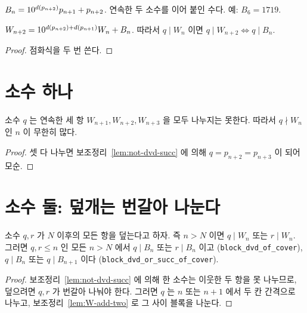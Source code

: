 \begin{definition}[블록]
  \label{def:B}
  \leanok
  \(B_n = 10^{d(p_{n+2})} p_{n+1} + p_{n+2}\). 연속한 두 소수를 이어 붙인 수다. 예: \(B_6 = 1719\).
\end{definition}

\begin{lemma}[두 칸 점화식, C4]
  \label{lem:W-add-two}
  \leanok
  \(W_{n+2} = 10^{d(p_{n+2}) + d(p_{n+1})} W_n + B_n\).
  따라서 \(q \mid W_n\) 이면 \(q \mid W_{n+2} \iff q \mid B_n\).
\end{lemma}
\begin{proof}
  \leanok
  점화식을 두 번 쓴다.
\end{proof}

\section{소수 하나}

\begin{theorem}[Q1, \(|S| = 1\), C5]
  \label{thm:one-prime}
  \leanok
  소수 \(q\) 는 연속한 세 항 \(W_{n+1}, W_{n+2}, W_{n+3}\) 을 모두 나누지는 못한다.
  따라서 \(q \nmid W_n\) 인 \(n\) 이 무한히 많다.
\end{theorem}
\begin{proof}
  \leanok
  셋 다 나누면 보조정리~\ref{lem:not-dvd-succ} 에 의해 \(q = p_{n+2} = p_{n+3}\) 이 되어 모순.
\end{proof}

\section{소수 둘: 덮개는 번갈아 나눈다}

\begin{lemma}[덮개와 블록]
  \label{lem:cover-block}
  \leanok
  소수 \(q, r\) 가 \(N\) 이후의 모든 항을 덮는다고 하자. 즉 \(n > N\) 이면 \(q \mid W_n\) 또는 \(r \mid W_n\).
  그러면 \(q, r \le n\) 인 모든 \(n > N\) 에서 \(q \mid B_n\) 또는 \(r \mid B_n\) 이고 (\texttt{block\_dvd\_of\_cover}),
  \(q \mid B_n\) 또는 \(q \mid B_{n+1}\) 이다 (\texttt{block\_dvd\_or\_succ\_of\_cover}).
\end{lemma}
\begin{proof}
  \leanok
  보조정리~\ref{lem:not-dvd-succ} 에 의해 한 소수는 이웃한 두 항을 못 나누므로, 덮으려면 \(q, r\) 가
  번갈아 나눠야 한다. 그러면 \(q\) 는 \(n\) 또는 \(n+1\) 에서 두 칸 간격으로 나누고,
  보조정리~\ref{lem:W-add-two} 로 그 사이 블록을 나눈다.
\end{proof}

